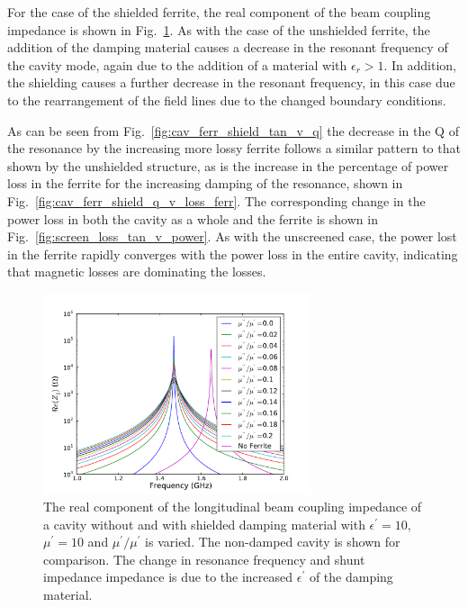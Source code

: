 For the case of the shielded ferrite, the real component of the beam coupling impedance is shown in Fig.~\ref{fig:screen_long_imp}. As with the case of the unshielded ferrite, the addition of the damping material causes a decrease in the resonant frequency of the cavity mode, again due to the addition of a material with $\epsilon_{r} > 1$. In addition, the shielding causes a further decrease in the resonant frequency, in this case due to the rearrangement of the field lines due to the changed boundary conditions.

As can be seen from Fig.~\ref{fig:cav_ferr_shield_tan_v_q} the decrease in the Q of the resonance by the increasing more lossy ferrite follows a similar pattern to that shown by the unshielded structure, as is the increase in the percentage of power loss in the ferrite for the increasing damping of the resonance, shown in Fig.~\ref{fig:cav_ferr_shield_q_v_loss_ferr}. The corresponding change in the power loss in both the cavity as a whole and the ferrite is shown in Fig.~\ref{fig:screen_loss_tan_v_power}. As with the unscreened case, the power lost in the ferrite rapidly converges with the power loss in the entire cavity, indicating that magnetic losses are dominating the losses.	

\begin{figure}
\begin{center}
\includegraphics[width=0.7\textwidth]{Beam_Coupling_Impedance_Reduction_Techniques/figures/screen_long_imp_all.pdf}
\end{center}
\label{fig:screen_long_imp}
\caption{The real component of the longitudinal beam coupling impedance of a cavity without and with shielded damping material with $\epsilon^{'}=10$, $\mu^{'}=10$ and $\mu^{'}/\mu^{'}$ is varied. The non-damped cavity is shown for comparison. The change in resonance frequency and shunt impedance impedance is due to the increased $\epsilon^{'}$ of the damping material.}
\end{figure}


